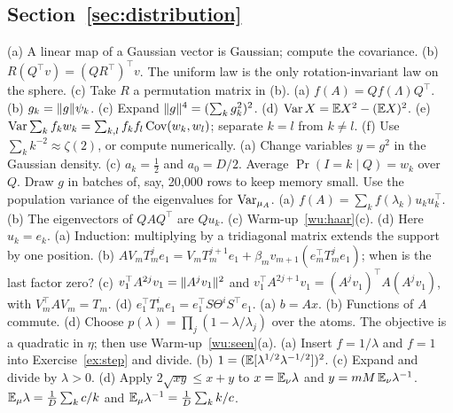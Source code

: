 \subsection*{Section~\ref{sec:distribution}}
\begin{hintlist}
 (a) A linear map of a Gaussian vector is Gaussian; compute the covariance. (b)
$R(Q^\top v)=(QR^\top)^\top v$. The uniform law is the only rotation-invariant law on the sphere. (c) Take $R$ a
permutation matrix in (b).
 (a) $f(A)=Qf(\Lambda)Q^\top$. (b) $g_k=\lVert g\rVert\psi_k$. (c) Expand
$\lVert g\rVert^4=(\sum_kg_k^2)^2$. (d) $\operatorname{Var} X=\mathbb{E} X^2-(\mathbb{E} X)^2$. (e) $\operatorname{Var}\sum_kf_kw_k=\sum_{k,l}f_kf_l\operatorname{Cov}(w_k,w_l)$;
separate $k=l$ from $k\ne l$. (f) Use $\sum_kk^{-2}\approx\zeta(2)$, or compute numerically.
 (a) Change variables $y=g^2$ in the Gaussian density. (c) $a_k=\frac12$ and $a_0=D/2$.
 Average $\Pr(I=k\mid Q)=w_k$ over $Q$.
 Draw $g$ in batches of, say, 20{,}000 rows to keep memory small. Use the population variance
of the eigenvalues for $\operatorname{Var}_{\mu_A}$.
 (a) $f(A)=\sum_kf(\lambda_k)u_ku_k^\top$. (b) The eigenvectors of $QAQ^\top$ are $Qu_k$. (c)
Warm-up~\ref{wu:haar}(c). (d) Here $u_k=e_k$.
 (a) Induction: multiplying by a tridiagonal matrix extends the support by one
position. (b) $AV_mT_m^je_1=V_mT_m^{j+1}e_1+\beta_mv_{m+1}(e_m^\top T_m^je_1)$; when is the last factor zero? (c)
$v_1^\top A^{2j}v_1=\lVert A^jv_1\rVert^2$ and $v_1^\top A^{2j+1}v_1=(A^jv_1)^\top A(A^jv_1)$, with $V_m^\top AV_m=T_m$. (d)
$e_1^\top T_m^ie_1=e_1^\top S\Theta^iS^\top e_1$.
 (a) $b=Ax$. (b) Functions of $A$ commute. (d) Choose $p(\lambda)=\prod_j(1-\lambda/\lambda_j)$
over the atoms.
 The objective is a quadratic in $\eta$; then use Warm-up~\ref{wu:seen}(a).
 (a) Insert $f=1/\lambda$ and $f=1$ into Exercise~\ref{ex:step} and divide. (b)
$1=(\mathbb{E}[\lambda^{1/2}\lambda^{-1/2}])^2$. (c) Expand and divide by $\lambda>0$. (d) Apply $2\sqrt{xy}\le x+y$ to
$x=\mathbb{E}_\nu\lambda$ and $y=mM\,\mathbb{E}_\nu\lambda^{-1}$.
 $\mathbb{E}_\mu\lambda=\frac1D\sum_kc/k$ and $\mathbb{E}_\mu\lambda^{-1}=\frac1D\sum_kk/c$.

\end{hintlist}

